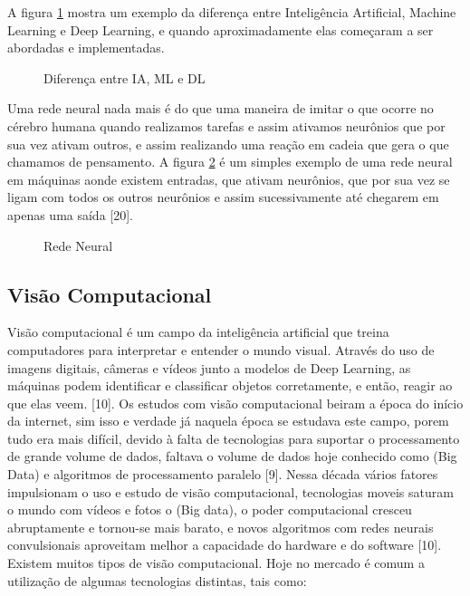 A figura \ref{fig:iamldl} mostra um exemplo da diferença entre Inteligência Artificial, Machine Learning e Deep Learning, e quando aproximadamente elas começaram a ser abordadas e implementadas.

%
\begin{figure}[H]
	\centering
	\caption{Diferença entre IA, ML e DL}
	\def\svgwidth{15cm}
	
	\label{fig:iamldl}
\end{figure}

Uma rede neural nada mais é do que uma maneira de imitar o que ocorre no cérebro humana quando realizamos tarefas e assim ativamos neurônios que por sua vez ativam outros, e assim realizando uma reação em cadeia que gera o que chamamos de pensamento. A figura \ref{fig:neural} é um simples exemplo de uma rede neural em máquinas aonde existem entradas, que ativam neurônios, que por sua vez se ligam com todos os outros neurônios e assim sucessivamente até chegarem em apenas uma saída [20].

\begin{figure}[H]
	\centering
	\caption{Rede Neural}
	\def\svgwidth{15cm}
	
	\label{fig:neural}
\end{figure}

\subsection{Visão Computacional}
Visão computacional é um campo da inteligência artificial que treina computadores para interpretar e entender o mundo visual. Através do uso de imagens digitais, câmeras e vídeos junto a modelos de Deep Learning, as máquinas podem identificar e classificar objetos corretamente, e então, reagir ao que elas veem. [10].
Os estudos com visão computacional beiram a época do início da internet, sim isso e verdade já naquela época se estudava este campo, porem tudo era mais difícil, devido à falta de tecnologias para suportar o processamento de grande volume de dados, faltava o volume de dados hoje conhecido como (Big Data) e algoritmos de processamento paralelo [9]. Nessa década vários fatores impulsionam o uso e estudo de visão computacional, tecnologias moveis saturam o mundo com vídeos e fotos o (Big data), o poder computacional cresceu abruptamente e tornou-se mais barato, e novos algoritmos com redes neurais convulsionais aproveitam melhor a capacidade do hardware e do software [10].
 Existem muitos tipos de visão computacional. Hoje no mercado é comum a utilização de algumas tecnologias distintas, tais como:

